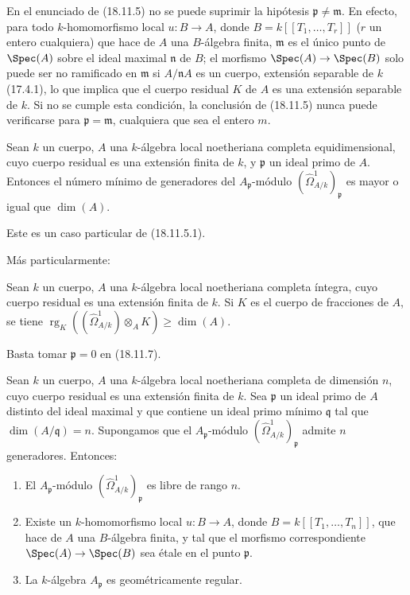\begin{remark}[18.11.6]
\label{IV.18.11.6}
En el enunciado de (18.11.5) no se puede suprimir la hipótesis $\mathfrak p\neq\mathfrak m$. En efecto, para todo $k$-homomorfismo local $u:B\to A$, donde $B=k[[T_1,\ldots,T_r]]$ ($r$ un entero cualquiera) que hace de $A$ una $B$-álgebra finita, $\mathfrak m$ es el único punto de $\Spec(A)$ sobre el ideal maximal $\mathfrak n$ de $B$; el morfismo $\Spec(A)\to\Spec(B)$ solo puede ser no ramificado en $\mathfrak m$ si $A/\mathfrak nA$ es un cuerpo, extensión separable de $k$ (17.4.1), lo que implica que el cuerpo residual $K$ de $A$ es una extensión separable de $k$. Si no se cumple esta condición, la conclusión de (18.11.5) nunca puede verificarse para $\mathfrak p=\mathfrak m$, cualquiera que sea el entero $m$.
\end{remark}

\begin{corollary}[18.11.7]
\label{IV.18.11.7}
Sean $k$ un cuerpo, $A$ una $k$-álgebra local noetheriana completa equidimensional, cuyo cuerpo residual es una extensión finita de $k$, y $\mathfrak p$ un ideal primo de $A$. Entonces el número mínimo de generadores del $A_{\mathfrak p}$-módulo $(\hat{\Omega}^1_{A/k})_{\mathfrak p}$ es mayor o igual que $\dim(A)$.
\end{corollary}

Este es un caso particular de (18.11.5.1).

Más particularmente:


\begin{corollary}[18.11.8]
\label{IV.18.11.8}
Sean $k$ un cuerpo, $A$ una $k$-álgebra local noetheriana completa \textup{íntegra}, cuyo cuerpo residual es una extensión finita de $k$. Si $K$ es el cuerpo de fracciones de $A$, se tiene
$\operatorname{rg}_K((\hat{\Omega}^1_{A/k})\otimes_A K)\geq\dim(A)$.
\end{corollary}

Basta tomar $\mathfrak p=0$ en (18.11.7).

\begin{corollary}[18.11.9]
\label{IV.18.11.9}
Sean $k$ un cuerpo, $A$ una $k$-álgebra local noetheriana completa de dimensión $n$, cuyo cuerpo residual es una extensión finita de $k$. Sea $\mathfrak p$ un ideal primo de $A$ distinto del ideal maximal y que contiene un ideal primo mínimo $\mathfrak q$ tal que $\dim(A/\mathfrak q)=n$. Supongamos que el $A_{\mathfrak p}$-módulo $(\hat{\Omega}^1_{A/k})_{\mathfrak p}$ admite $n$ generadores. Entonces:
\begin{enumerate}
  \item[\textup{(i)}] El $A_{\mathfrak p}$-módulo $(\hat{\Omega}^1_{A/k})_{\mathfrak p}$ es libre de rango $n$.
  \item[\textup{(ii)}] Existe un $k$-homomorfismo local $u:B\to A$, donde $B=k[[T_1,\ldots,T_n]]$, que hace de $A$ una $B$-álgebra finita, y tal que el morfismo correspondiente $\Spec(A)\to\Spec(B)$ sea étale en el punto $\mathfrak p$.
  \item[\textup{(iii)}] La $k$-álgebra $A_{\mathfrak p}$ es geométricamente regular.
\end{enumerate}
\end{corollary}

